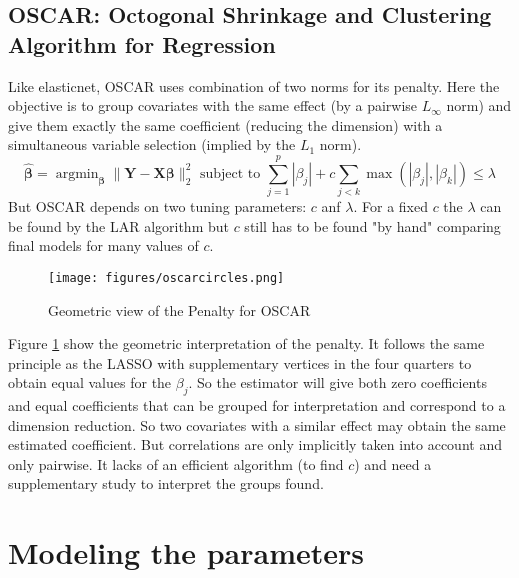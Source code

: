\documentclass[12pt,a4paper]{report}
\begin{document}
		 \FloatBarrier

		\subsection{OSCAR: Octogonal Shrinkage and Clustering Algorithm for Regression}		%

			Like elasticnet, \textsc{OSCAR} \cite{bondell2008simultaneous} uses combination of two norms for its penalty. Here the objective is to group covariates with the same effect (by a pairwise $L_\infty$ norm) and give them exactly the same coefficient (reducing the dimension) with a simultaneous variable selection (implied by the $L_1$ norm).
			\begin{equation}
				\hat{\boldsymbol{\beta}}=\operatorname{argmin}_{\boldsymbol{\beta}} \parallel\boldsymbol{Y}-\boldsymbol{X}\boldsymbol{\beta} \parallel^2_2 \textrm{ subject to } \sum_{j=1}^p|\beta_j|+c\sum_{j<k}\operatorname{max}(|\beta_j|,|\beta_k|) \leq \lambda		
			\end{equation}						
			But \textsc{OSCAR} depends on two tuning parameters: $c$ anf $\lambda$. For a fixed $c$ the $\lambda$ can be found by the \textsc{LAR} algorithm but $c$ still has to be found "by hand" comparing final models for many values of $c$.
			
\begin{figure}[h!]
			\centering
			\texttt{[image: figures/oscarcircles.png]} 
			\caption{Geometric view of the Penalty for OSCAR}\label{oscarcircles}
		\end{figure} 
Figure 	\ref{oscarcircles} show the geometric interpretation of the penalty. It follows the same principle as the LASSO with supplementary vertices in the four quarters to obtain equal values for the $\beta_j$. So the estimator will give both zero coefficients and equal coefficients that can be grouped for interpretation and correspond to a dimension reduction. So two covariates with a similar effect may obtain the same estimated coefficient. But correlations are only implicitly taken into account and only pairwise. It lacks of an efficient algorithm  (to find $c$) and need a supplementary study to interpret the groups found.
		
		
	\section{Modeling the parameters}			%
\end{document}
